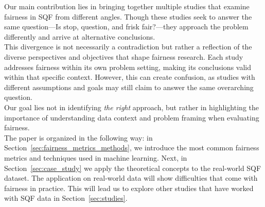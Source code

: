 Our main contribution lies in bringing together multiple studies that examine fairness in SQF from different angles. Though these studies seek to answer the same question—Is stop, question, and frisk fair?—they approach the problem differently and arrive at alternative conclusions.\\
This divergence is not necessarily a contradiction but rather a reflection of the diverse perspectives and objectives that shape fairness research. Each study addresses fairness within its own problem setting, making its conclusions valid within that specific context. However, this can create confusion, as studies with different assumptions and goals may still claim to answer the same overarching question.\\
Our goal lies not in identifying \textit{the right} approach, but rather in highlighting the importance of understanding data context and problem framing when evaluating fairness.\\
The paper is organized in the following way: in Section~\ref{sec:fairness_metrics_methods}, we introduce the most common fairness metrics and techniques used in machine learning.
Next, in Section~\ref{sec:case_study} we apply the theoretical concepts to the real-world SQF dataset. 
The application on real-world data will show difficulties that come with fairness in practice.
This will lead us to explore other studies that have worked with SQF data in Section~\ref{sec:studies}. 


